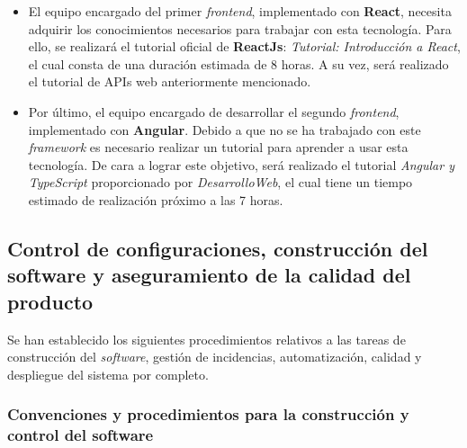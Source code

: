 \documentclass[11pt, a4paper, titlepage]{article}
\begin{document}
\begin{itemize}
\item El equipo encargado del primer \textit{frontend}, implementado con \textbf{React}, necesita adquirir los conocimientos necesarios para trabajar con esta tecnología. Para ello, se realizará el tutorial oficial de \textbf{ReactJs}: \textit{Tutorial: Introducción a React}\cite{reactjs}, el cual consta de una duración estimada de 8 horas. A su vez, será realizado el tutorial de APIs web anteriormente mencionado\cite{apisweb}.

\item Por último, el equipo encargado de desarrollar el segundo \textit{frontend}, implementado con \textbf{Angular}. Debido a que no se ha trabajado con este \textit{framework} es necesario realizar un tutorial para aprender a usar esta tecnología. De cara a lograr este objetivo, será realizado el tutorial \textit{Angular y TypeScript}\cite{angular} proporcionado por \textit{DesarrolloWeb}, el cual tiene un tiempo estimado de realización próximo a las 7 horas.

\end{itemize}

\subsection{Control de configuraciones, construcción del software y aseguramiento de la calidad del producto}

Se han establecido los siguientes procedimientos relativos a las tareas de construcción del \textit{software}, gestión de incidencias, automatización, calidad y despliegue del sistema por completo.

\subsubsection{Convenciones y procedimientos para la construcción y control del software}
\end{document}
